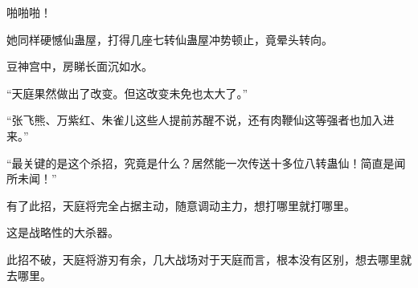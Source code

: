\begin{this_body}
啪啪啪！

她同样硬憾仙蛊屋，打得几座七转仙蛊屋冲势顿止，竟晕头转向。

豆神宫中，房睇长面沉如水。

“天庭果然做出了改变。但这改变未免也太大了。”

“张飞熊、万紫红、朱雀儿这些人提前苏醒不说，还有肉鞭仙这等强者也加入进来。”

“最关键的是这个杀招，究竟是什么？居然能一次传送十多位八转蛊仙！简直是闻所未闻！”

有了此招，天庭将完全占据主动，随意调动主力，想打哪里就打哪里。

这是战略性的大杀器。

此招不破，天庭将游刃有余，几大战场对于天庭而言，根本没有区别，想去哪里就去哪里。

\end{this_body}

